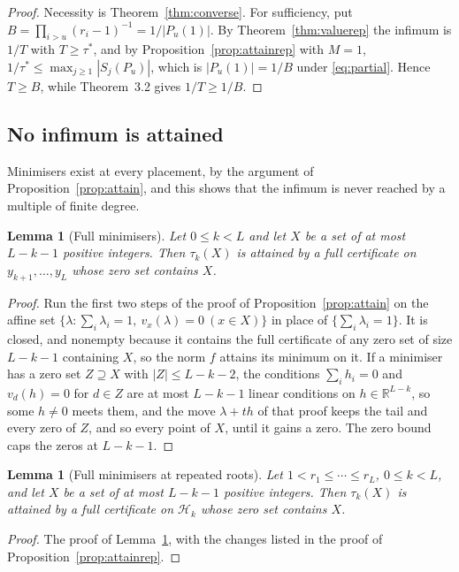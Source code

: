 \documentclass[11pt]{article}
\newtheorem{lemma}[theorem]{Lemma}
\theoremstyle{definition}
\theoremstyle{plain}
\newcommand{\R}{\mathbb R}
\begin{document}
\begin{proof}
Necessity is Theorem~\ref{thm:converse}.  For sufficiency, put
$B=\prod_{i>u}(r_i-1)^{-1}=1/|P_u(1)|$.  By Theorem~\ref{thm:valuerep} the
infimum is $1/T$ with $T\ge\tau^*$, and by Proposition~\ref{prop:attainrep}
with $M=1$, $1/\tau^*\le\max_{j\ge1}|S_j(P_u)|$, which is $|P_u(1)|=1/B$
under \eqref{eq:partial}.  Hence $T\ge B$, while Theorem~3.2 gives
$1/T\ge1/B$.
\end{proof}

\subsection*{No infimum is attained}

Minimisers exist at every placement, by the argument of
Proposition~\ref{prop:attain}, and this shows that the infimum is never
reached by a multiple of finite degree.

\begin{lemma}[Full minimisers]\label{lem:attainX}
Let $0\le k<L$ and let $X$ be a set of at most $L-k-1$ positive integers.  Then
$\tau_k(X)$ is attained by a full certificate on $y_{k+1},\ldots,y_L$ whose
zero set contains $X$.
\end{lemma}

\begin{proof}
Run the first two steps of the proof of Proposition~\ref{prop:attain} on the
affine set $\{\lambda:\sum_i\lambda_i=1,\ v_x(\lambda)=0\ (x\in X)\}$ in place
of $\{\sum_i\lambda_i=1\}$.  It is closed, and nonempty because it contains the
full certificate of any zero set of size $L-k-1$ containing $X$, so the norm
$f$ attains its minimum on it.  If a minimiser has a zero set $Z\supseteq X$
with $|Z|\le L-k-2$, the conditions $\sum_ih_i=0$ and $v_d(h)=0$ for $d\in Z$
are at most $L-k-1$ linear conditions on $h\in\R^{L-k}$, so some $h\ne0$ meets
them, and the move $\lambda+th$ of that proof keeps the tail and every zero of
$Z$, and so every point of $X$, until it gains a zero.  The zero bound caps
the zeros at $L-k-1$.
\end{proof}

\begin{lemma}[Full minimisers at repeated roots]\label{lem:attainXrep}
Let $1<r_1\le\cdots\le r_L$, $0\le k<L$, and let $X$ be a set of at most
$L-k-1$ positive integers.  Then $\tau_k(X)$ is attained by a full
certificate on $\mathcal H_k$ whose zero set contains $X$.
\end{lemma}

\begin{proof}
The proof of Lemma~\ref{lem:attainX}, with the changes listed in the proof
of Proposition~\ref{prop:attainrep}.
\end{proof}
\end{document}
